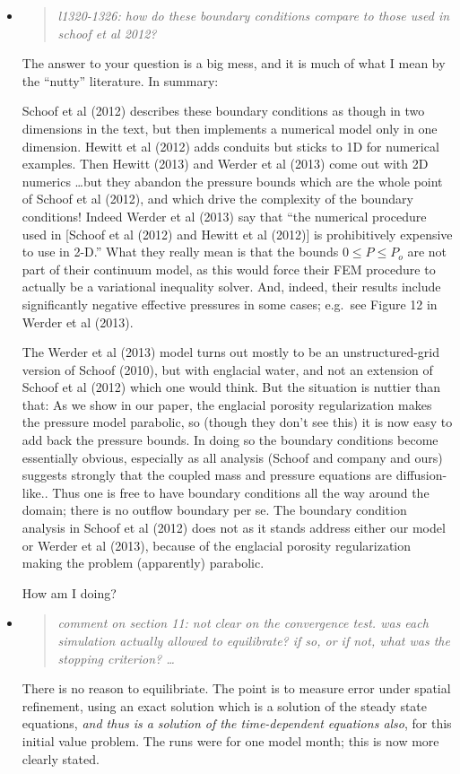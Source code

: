 \documentclass[11pt,reqno]{amsart}
\newcommand{\reply}[2]{
\medskip\medskip
\item  \begin{quote}
\emph{#1}
\end{quote}

\medskip
\noindent #2}
\begin{document}
\begin{itemize}
\reply{l1320-1326: how do these boundary conditions compare to those used in schoof et al 2012?}{The answer to your question is a big mess, and it is much of what I mean by the ``nutty'' literature.  In summary:

\medskip
Schoof et al (2012) describes these boundary conditions as though in two dimensions in the text, but then implements a numerical model only in one dimension.  Hewitt et al (2012) adds conduits but sticks to 1D for numerical examples.  Then Hewitt (2013) and Werder et al (2013) come out with 2D numerics \dots but they abandon the pressure bounds which are the whole point of Schoof et al (2012), and which drive the complexity of the boundary conditions!  Indeed Werder et al (2013) say that ``the numerical procedure used in [Schoof et al (2012) and Hewitt et al (2012)] is prohibitively expensive to use in 2-D.''  What they really mean is that the bounds $0\le P \le P_o$ are not part of their continuum model, as this would force their FEM procedure to actually be a variational inequality solver.  And, indeed, their results include significantly negative effective pressures in some cases; e.g.~see Figure 12 in Werder et al (2013).

\medskip
The Werder et al (2013) model turns out mostly to be an unstructured-grid version of Schoof (2010), but with englacial water, and not an extension of Schoof et al (2012) which one would think.  But the situation is nuttier than that:  As we show in our paper, the englacial porosity regularization makes the pressure model parabolic, so (though they don't see this) it is now easy to add back the pressure bounds.  In doing so the boundary conditions become essentially obvious, especially as all analysis (Schoof and company and ours) suggests strongly that the coupled mass and pressure equations are diffusion-like..  Thus one is free to have boundary conditions all the way around the domain; there is no outflow boundary per se.  The boundary condition analysis in Schoof et al (2012) does not as it stands address either our model or Werder et al (2013), because of the englacial porosity regularization making the problem (apparently) parabolic.

\medskip
How am I doing?}

\reply{comment on section 11: not clear on the convergence test. was each simulation actually allowed to equilibrate? if so, or if not, what was the stopping criterion? \dots}{There is no reason to equilibriate.  The point is to measure error under spatial refinement, using an exact solution which is a solution of the steady state equations, \emph{and thus is a solution of the time-dependent equations also}, for this initial value problem.  The runs were for one model month; this is now more clearly stated.}


\end{itemize}
\end{document}
